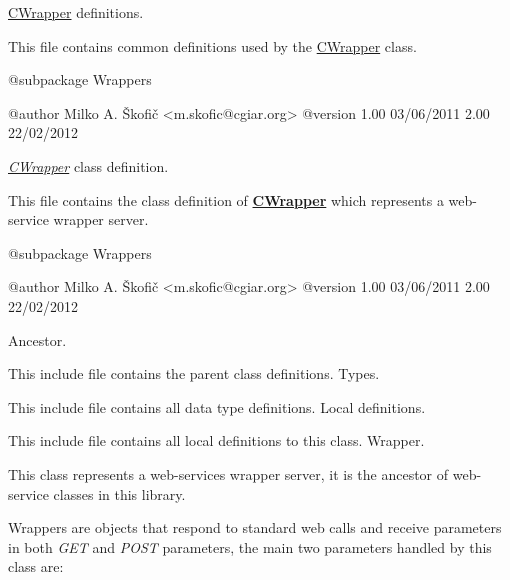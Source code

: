 \hyperlink{class_c_wrapper}{C\-Wrapper} definitions.

This file contains common definitions used by the \hyperlink{class_c_wrapper}{C\-Wrapper} class.

\begin{DoxyVerb}    @subpackage     Wrappers

    @author         Milko A. Škofič <m.skofic@cgiar.org>
    @version        1.00 03/06/2011
                            2.00 22/02/2012\end{DoxyVerb}


{\itshape \hyperlink{class_c_wrapper}{C\-Wrapper}} class definition.

This file contains the class definition of {\bfseries \hyperlink{class_c_wrapper}{C\-Wrapper}} which represents a web-\/service wrapper server.

\begin{DoxyVerb}    @subpackage     Wrappers

    @author         Milko A. Škofič <m.skofic@cgiar.org>
    @version        1.00 03/06/2011
                            2.00 22/02/2012\end{DoxyVerb}


Ancestor.

This include file contains the parent class definitions. Types.

This include file contains all data type definitions. Local definitions.

This include file contains all local definitions to this class. Wrapper.

This class represents a web-\/services wrapper server, it is the ancestor of web-\/service classes in this library.

Wrappers are objects that respond to standard web calls and receive parameters in both {\itshape G\-E\-T} and {\itshape P\-O\-S\-T} parameters, the main two parameters handled by this class are\-:



